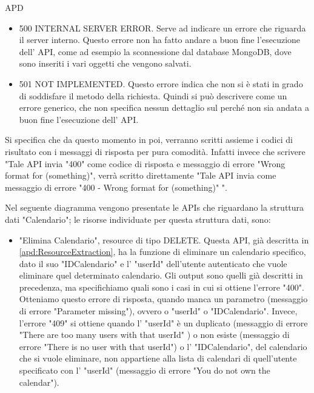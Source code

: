 \begin{listaPersonale} {APD}
\begin{listaPersonale2}[APD]{}
\begin{itemize}
            \item 500 INTERNAL SERVER ERROR. Serve ad indicare un errore che riguarda il server interno. Questo errore non ha fatto andare a buon fine l'esecuzione dell' API, come ad esempio la sconnessione dal database MongoDB, dove sono inseriti i vari oggetti che vengono salvati.
            \item 501 NOT IMPLEMENTED. Questo errore indica che non si è stati in grado di soddisfare il metodo della richiesta. Quindi si può descrivere come un errore generico, che non specifica nessun dettaglio sul perché non sia andata a buon fine l'esecuzione dell' API.
        \end{itemize}
        Si specifica che da questo momento in poi, verranno scritti assieme i codici di risultato con i messaggi di risposta per pura comodità. Infatti invece che scrivere "Tale API invia "400" come codice di risposta e messaggio di errore "Wrong format for (something)", verrà scritto direttamente "Tale API invia come messaggio di errore "400 - Wrong format for (something)" ".
        \begin{center}
            
        \end{center}
        \newpage
        \begin{listaPersonale3}[APD]{}
            Nel seguente diagramma vengono presentate le APIs che riguardano la struttura dati "Calendario"; le risorse individuate per questa struttura dati, sono:
            \begin{itemize}
                \item "Elimina Calendario", resource di tipo DELETE. Questa API, già descritta in \ref{apd:ResourceExtraction}, ha la funzione di eliminare un calendario specifico, dato il suo "IDCalendario" e l' "userId" dell'utente autenticato che vuole eliminare quel determinato calendario. Gli output sono quelli già descritti in precedenza, ma specifichiamo quali sono i casi in cui si ottiene l'errore "400". Otteniamo questo errore di risposta, quando manca un parametro (messaggio di errore "Parameter missing"), ovvero o "userId" o "IDCalendario". Invece, l'errore "409" si ottiene quando l' "userId" è un duplicato (messaggio di errore "There are too many users with that userId" ) o non esiste (messaggio di errore "There is no user with that userId") o l' "IDCalendario", del calendario che si vuole eliminare, non appartiene alla lista di calendari di quell'utente specificato con l' "userId" (messaggio di errore "You do not own the calendar").

\end{itemize}
\end{listaPersonale3}
\end{listaPersonale2}
\end{listaPersonale}
